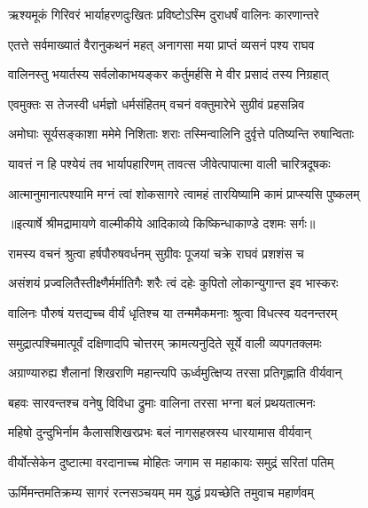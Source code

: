 \twolineshloka
{ऋश्यमूकं गिरिवरं भार्याहरणदुःखितः}
{प्रविष्टोऽस्मि दुराधर्षं वालिनः कारणान्तरे} %

\twolineshloka
{एतत्ते सर्वमाख्यातं वैरानुकथनं महत्}
{अनागसा मया प्राप्तं व्यसनं पश्य राघव} %

\twolineshloka
{वालिनस्तु भयार्तस्य सर्वलोकाभयङ्कर}
{कर्तुमर्हसि मे वीर प्रसादं तस्य निग्रहात्} %

\twolineshloka
{एवमुक्तः स तेजस्वी धर्मज्ञो धर्मसंहितम्}
{वचनं वक्तुमारेभे सुग्रीवं प्रहसन्निव} %

\twolineshloka
{अमोघाः सूर्यसङ्काशा ममेमे निशिताः शराः}
{तस्मिन्वालिनि दुर्वृत्ते पतिष्यन्ति रुषान्विताः} %

\twolineshloka
{यावत्तं न हि पश्येयं तव भार्यापहारिणम्}
{तावत्स जीवेत्पापात्मा वाली चारित्रदूषकः} %

\twolineshloka
{आत्मानुमानात्पश्यामि मग्नं त्वां शोकसागरे}
{त्वामहं तारयिष्यामि कामं प्राप्स्यसि पुष्कलम्} %


{॥इत्यार्षे श्रीमद्रामायणे वाल्मीकीये आदिकाव्ये किष्किन्धाकाण्डे दशमः सर्गः॥}


\twolineshloka
{रामस्य वचनं श्रुत्वा हर्षपौरुषवर्धनम्}
{सुग्रीवः पूजयां चक्रे राघवं प्रशशंस च} %

\twolineshloka
{असंशयं प्रज्वलितैस्तीक्ष्णैर्मर्मातिगैः शरैः}
{त्वं दहेः कुपितो लोकान्युगान्त इव भास्करः} %

\twolineshloka
{वालिनः पौरुषं यत्तद्यच्च वीर्यं धृतिश्च या}
{तन्ममैकमनाः श्रुत्वा विधत्स्व यदनन्तरम्} %

\twolineshloka
{समुद्रात्पश्चिमात्पूर्वं दक्षिणादपि चोत्तरम्}
{क्रामत्यनुदिते सूर्ये वाली व्यपगतक्लमः} %

\twolineshloka
{अग्राण्यारुह्य शैलानां शिखराणि महान्त्यपि}
{ऊर्ध्वमुत्क्षिप्य तरसा प्रतिगृह्णाति वीर्यवान्} %

\twolineshloka
{बहवः सारवन्तश्च वनेषु विविधा द्रुमाः}
{वालिना तरसा भग्ना बलं प्रथयतात्मनः} %

\twolineshloka
{महिषो दुन्दुभिर्नाम कैलासशिखरप्रभः}
{बलं नागसहस्रस्य धारयामास वीर्यवान्} %

\twolineshloka
{वीर्योत्सेकेन दुष्टात्मा वरदानाच्च मोहितः}
{जगाम स महाकायः समुद्रं सरितां पतिम्} %

\twolineshloka
{ऊर्मिमन्तमतिक्रम्य सागरं रत्नसञ्चयम्}
{मम युद्धं प्रयच्छेति तमुवाच महार्णवम्} %

